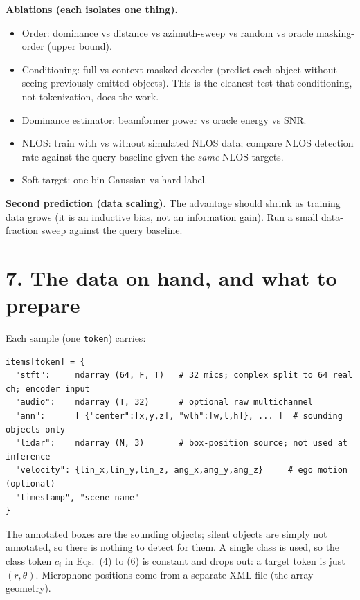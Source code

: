\documentclass[10pt]{article}
\begin{document}
\textbf{Ablations (each isolates one thing).}
\begin{itemize}
\item Order: dominance vs distance vs azimuth-sweep vs random vs oracle
masking-order (upper bound).
\item Conditioning: full vs context-masked decoder (predict each object without
seeing previously emitted objects). This is the cleanest test that conditioning,
not tokenization, does the work.
\item Dominance estimator: beamformer power vs oracle energy vs SNR.
\item NLOS: train with vs without simulated NLOS data; compare NLOS detection rate
against the query baseline given the \emph{same} NLOS targets.
\item Soft target: one-bin Gaussian vs hard label.
\end{itemize}

\textbf{Second prediction (data scaling).} The advantage should shrink as training
data grows (it is an inductive bias, not an information gain). Run a small
data-fraction sweep against the query baseline.

\section*{7. The data on hand, and what to prepare}
Each sample (one \texttt{token}) carries:
{\small
\begin{verbatim}
items[token] = {
  "stft":     ndarray (64, F, T)   # 32 mics; complex split to 64 real ch; encoder input
  "audio":    ndarray (T, 32)      # optional raw multichannel
  "ann":      [ {"center":[x,y,z], "wlh":[w,l,h]}, ... ]  # sounding objects only
  "lidar":    ndarray (N, 3)       # box-position source; not used at inference
  "velocity": {lin_x,lin_y,lin_z, ang_x,ang_y,ang_z}     # ego motion (optional)
  "timestamp", "scene_name"
}
\end{verbatim}
}
The annotated boxes are the sounding objects; silent objects are simply not
annotated, so there is nothing to detect for them. A single class is used, so the
class token $c_i$ in Eqs.~(4) to (6) is constant and drops out: a target token is
just $(r,\theta)$. Microphone positions come from a separate XML file (the array
geometry).
\end{document}
